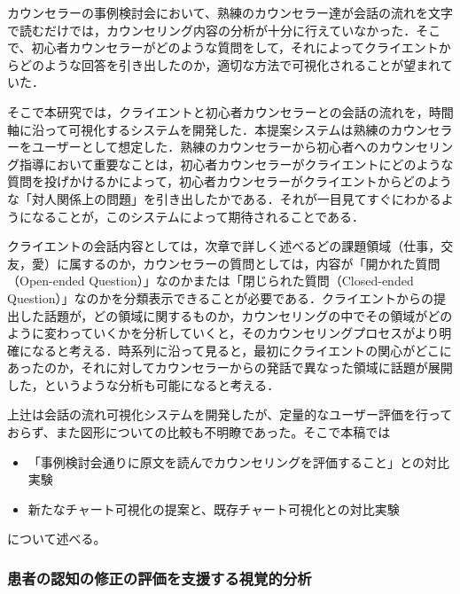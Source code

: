 \documentclass[shuuron]{kuee}
\begin{document}
カウンセラーの事例検討会において、熟練のカウンセラー達が会話の流れを文字で読むだけでは，カウンセリング内容の分析が十分に行えていなかった．そこで、初心者カウンセラーがどのような質問をして，それによってクライエントからどのような回答を引き出したのか，適切な方法で可視化されることが望まれていた．

そこで本研究では，クライエントと初心者カウンセラーとの会話の流れを，時間軸に沿って可視化するシステムを開発した．本提案システムは熟練のカウンセラーをユーザーとして想定した．熟練のカウンセラーから初心者へのカウンセリング指導において重要なことは，初心者カウンセラーがクライエントにどのような質問を投げかけるかによって，初心者カウンセラーがクライエントからどのような「対人関係上の問題」を引き出したかである．それが一目見てすぐにわかるようになることが，このシステムによって期待されることである．%



クライエントの会話内容としては，次章で詳しく述べるどの課題領域（仕事，交友，愛）に属するのか，カウンセラーの質問としては，内容が「開かれた質問（Open-ended Question）」なのかまたは「閉じられた質問（Closed-ended Question）」なのかを分類表示できることが必要である．クライエントからの提出した話題が，どの領域に関するものか，カウンセリングの中でその領域がどのように変わっていくかを分析していくと，そのカウンセリングプロセスがより明確になると考える．時系列に沿って見ると，最初にクライエントの関心がどこにあったのか，それに対してカウンセラーからの発話で異なった領域に話題が展開した，というような分析も可能になると考える．

上辻\cite{uetsuji}は会話の流れ可視化システムを開発したが、定量的なユーザー評価を行っておらず、また図形についての比較も不明瞭であった。そこで本稿では
\begin{itemize}
\item 「事例検討会通りに原文を読んでカウンセリングを評価すること」との対比実験
\item 新たなチャート可視化の提案と、既存チャート可視化との対比実験
\end{itemize}
について述べる。

\subsubsection{患者の認知の修正の評価を支援する視覚的分析}

\end{document}
